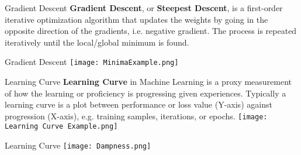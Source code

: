 \documentclass{beamer}
\begin{document}
\begin{frame}[fragile]{Gradient Descent}
    \textbf{Gradient Descent}, or \textbf{Steepest Descent}, is a first-order iterative optimization algorithm that updates the weights by going in the opposite direction of the gradients, i.e. negative gradient. The process is repeated iteratively until the local/global minimum is found.
\end{frame}
\begin{frame}[fragile]{Gradient Descent}
    \texttt{[image: MinimaExample.png]}
\end{frame}

\begin{frame}[fragile]{Learning Curve}
    \textbf{Learning Curve} in Machine Learning is a proxy measurement of how the learning or proficiency is progressing given experiences. Typically a learning curve is a plot between performance or loss value (Y-axis) against progression (X-axis), e.g. training samples, iterations, or epochs.
    \texttt{[image: Learning Curve Example.png]}
\end{frame}
\begin{frame}[fragile]{Learning Curve}
    \texttt{[image: Dampness.png]}
\end{frame}
\end{document}
